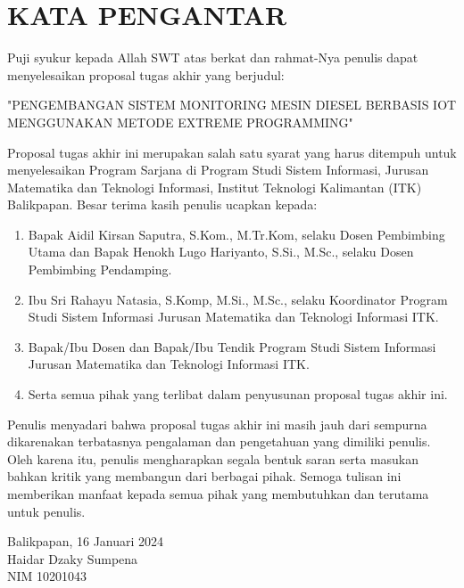 \chapter*{KATA PENGANTAR}

Puji syukur kepada Allah SWT atas berkat dan rahmat-Nya penulis dapat menyelesaikan proposal tugas akhir yang berjudul:

\begin{center}
    "PENGEMBANGAN SISTEM MONITORING MESIN DIESEL BERBASIS IOT MENGGUNAKAN METODE EXTREME PROGRAMMING" 
\end{center}

Proposal tugas akhir ini merupakan salah satu syarat yang harus
ditempuh untuk menyelesaikan Program Sarjana di Program Studi Sistem
Informasi, Jurusan Matematika dan Teknologi Informasi, Institut Teknologi
Kalimantan (ITK) Balikpapan. Besar terima kasih penulis ucapkan kepada:

\begin{enumerate}[topsep=0pt,itemsep=0pt,partopsep=0pt, parsep=0pt]

    \item Bapak Aidil Kirsan Saputra, S.Kom., M.Tr.Kom, selaku Dosen Pembimbing Utama dan
    Bapak Henokh Lugo Hariyanto, S.Si., M.Sc., selaku Dosen Pembimbing
    Pendamping.

    \item Ibu Sri Rahayu Natasia, S.Komp, M.Si., M.Sc., selaku Koordinator Program
    Studi Sistem Informasi Jurusan Matematika dan Teknologi Informasi ITK.
    
    \item Bapak/Ibu Dosen dan Bapak/Ibu Tendik Program Studi Sistem Informasi
    Jurusan Matematika dan Teknologi Informasi ITK.

    \item Serta semua pihak yang terlibat dalam penyusunan proposal tugas akhir ini.
\end{enumerate}

Penulis menyadari bahwa proposal tugas akhir ini masih jauh dari sempurna dikarenakan terbatasnya pengalaman dan pengetahuan yang dimiliki penulis. Oleh karena itu, penulis mengharapkan segala bentuk saran serta masukan bahkan kritik yang membangun dari berbagai pihak. Semoga tulisan ini memberikan manfaat kepada semua pihak yang membutuhkan dan terutama untuk penulis.

\vspace{1cm}
\begin{flushright}
    Balikpapan, 16 Januari 2024\\
    \vspace{2.5cm}
    {Haidar Dzaky Sumpena}\\
    NIM {10201043}
\end{flushright}

